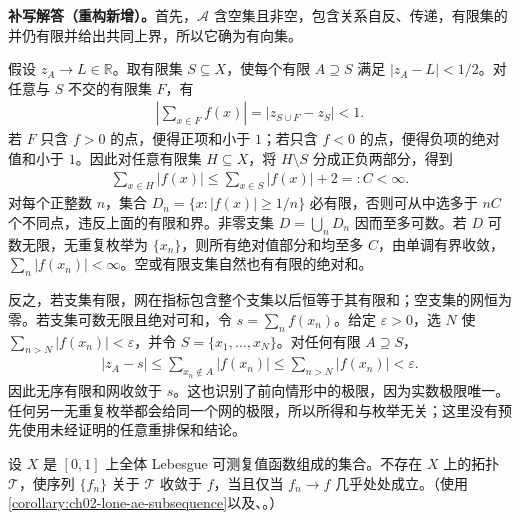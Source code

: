 \documentclass[../../main.tex]{subfiles}%
\begin{document}
\begin{solution}
\textbf{补写解答（重构新增）。}首先，$\mathcal A$ 含空集且非空，包含关系自反、传递，有限集的并仍有限并给出共同上界，所以它确为有向集。

假设 $z_A\to L\in\mathbb R$。取有限集 $S\subseteq X$，使每个有限 $A\supseteq S$ 满足 $|z_A-L|<1/2$。对任意与 $S$ 不交的有限集 $F$，有
\begin{align*}
\left|\sum_{x\in F}f(x)\right|=|z_{S\cup F}-z_S|<1.
\end{align*}
若 $F$ 只含 $f>0$ 的点，便得正项和小于 $1$；若只含 $f<0$ 的点，便得负项的绝对值和小于 $1$。因此对任意有限集 $H\subseteq X$，将 $H\setminus S$ 分成正负两部分，得到
\begin{align*}
\sum_{x\in H}|f(x)|\le\sum_{x\in S}|f(x)|+2=:C<\infty.
\end{align*}
对每个正整数 $n$，集合 $D_n=\{x:|f(x)|\ge1/n\}$ 必有限，否则可从中选多于 $nC$ 个不同点，违反上面的有限和界。非零支集 $D=\bigcup_nD_n$ 因而至多可数。若 $D$ 可数无限，无重复枚举为 $\{x_n\}$，则所有绝对值部分和均至多 $C$，由单调有界收敛，$\sum_n|f(x_n)|<\infty$。空或有限支集自然也有有限的绝对和。

反之，若支集有限，网在指标包含整个支集以后恒等于其有限和；空支集的网恒为零。若支集可数无限且绝对可和，令 $s=\sum_n f(x_n)$。给定 $\varepsilon>0$，选 $N$ 使 $\sum_{n>N}|f(x_n)|<\varepsilon$，并令 $S=\{x_1,\ldots,x_N\}$。对任何有限 $A\supseteq S$，
\begin{align*}
|z_A-s|\le\sum_{x_n\notin A}|f(x_n)|
\le\sum_{n>N}|f(x_n)|<\varepsilon.
\end{align*}
因此无序有限和网收敛于 $s$。这也识别了前向情形中的极限，因为实数极限唯一。任何另一无重复枚举都会给同一个网的极限，所以所得和与枚举无关；这里没有预先使用未经证明的任意重排保和结论。
\end{solution}
\begin{exercise}\label{exercise:ch04-ae-not-topological}
设 $X$ 是 $[0,1]$ 上全体 Lebesgue 可测复值函数组成的集合。不存在 $X$ 上的拓扑 $\mathcal T$，使序列 $\{f_n\}$ 关于 $\mathcal T$ 收敛于 $f$，当且仅当 $f_n\to f$ 几乎处处成立。（使用\cref{corollary:ch02-lone-ae-subsequence}以及、。）
\end{exercise}
\end{document}
